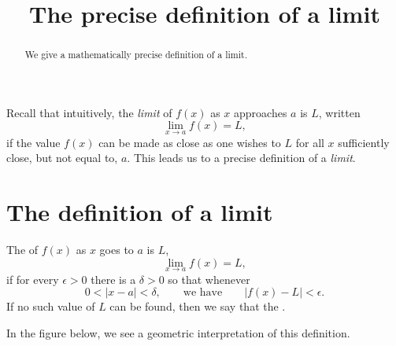 \documentclass{ximera}
\title[Dig-In:]{The precise definition of a limit}
\begin{document}
\begin{abstract}
  We give a mathematically precise definition of a limit.
\end{abstract}
\maketitle

Recall that intuitively, the \textit{limit} of $f(x)$ as $x$
approaches $a$ is $L$, written
\[
\lim_{x\to a} f(x) = L,
\]
if the value $f(x)$ can be made as close as one wishes to $L$ for
all $x$ sufficiently close, but not equal to, $a$.  This leads us to a
precise definition of a \textit{limit}.

\section{The definition of a limit}



\begin{definition}\label{def:limit}
The  of $f(x)$ as $x$ goes to $a$ is $L$,
\[
\lim_{x\to a} f(x) = L,
\] 
if for every $\epsilon>0$ there is a $\delta > 0$ so that whenever
\[
0 < |x-a| < \delta, \qquad\text{we have} \qquad |f(x)-L|<\epsilon.
\] 
If no such value of $L$ can be found, then we say that the .
\end{definition}

In the figure below, we see a geometric interpretation of this
definition.
\end{document}
